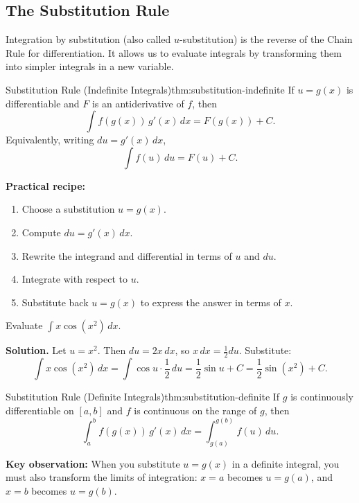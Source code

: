 \subsection{The Substitution Rule}

Integration by substitution (also called $u$-substitution) is the reverse of the Chain Rule for differentiation. It allows us to evaluate integrals by transforming them into simpler integrals in a new variable.

\begin{theorem}{Substitution Rule (Indefinite Integrals)}{thm:substitution-indefinite}
If $u=g(x)$ is differentiable and $F$ is an antiderivative of $f$, then
\[
\int f(g(x))\,g'(x)\,dx = F(g(x))+C.
\]
Equivalently, writing $du=g'(x)\,dx$,
\[
\int f(u)\,du = F(u)+C.
\]
\end{theorem}

\textbf{Practical recipe:}
\begin{enumerate}[label=(\arabic*)]
\item Choose a substitution $u=g(x)$.
\item Compute $du=g'(x)\,dx$.
\item Rewrite the integrand and differential in terms of $u$ and $du$.
\item Integrate with respect to $u$.
\item Substitute back $u=g(x)$ to express the answer in terms of $x$.
\end{enumerate}

\begin{examplebox}[title={Worked Example: $u$-substitution for indefinite integrals}]
Evaluate $\displaystyle \int x\cos(x^2)\,dx$.

\textbf{Solution.}
Let $u=x^2$. Then $du=2x\,dx$, so $x\,dx=\frac{1}{2}du$. Substitute:
\[
\int x\cos(x^2)\,dx = \int \cos u\cdot \frac{1}{2}\,du = \frac{1}{2}\sin u + C = \frac{1}{2}\sin(x^2)+C.
\]
\end{examplebox}

\begin{theorem}{Substitution Rule (Definite Integrals)}{thm:substitution-definite}
If $g$ is continuously differentiable on $[a,b]$ and $f$ is continuous on the range of $g$, then
\[
\int_a^b f(g(x))\,g'(x)\,dx = \int_{g(a)}^{g(b)} f(u)\,du.
\]
\end{theorem}

\textbf{Key observation:} When you substitute $u=g(x)$ in a definite integral, you must also transform the limits of integration: $x=a$ becomes $u=g(a)$, and $x=b$ becomes $u=g(b)$.


